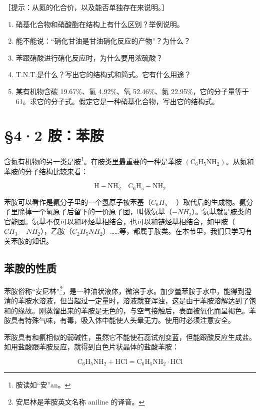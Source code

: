 ［提示：从氮的化合价，以及能否单独存在来说明。］

\begin{enumerate}[start=2]
\item
  硝基化合物和硝酸酯在结构上有什么区别？举例说明。
\item
  能不能说：``硝化甘油是甘油硝化反应的产物''？为什么？
\item
  苯跟硝酸进行硝化反应时，为什么要用浓硫酸？
\item
  T.N.T.是什么？写出它的结构式和简式。它有什么用途？
\item
  某有机物含碳 19.67\%、氢 4.92\%、氧 52.46\%、氮
  22.95\%，它的分子量等于
  61。求它的分子式。假定它是一种硝基化合物，写出它的结构式。
\end{enumerate}

\section{§4·2 胺：苯胺}

含氮有机物的另一类是胺\footnote{胺读如``安''an。}。在胺类里最重要的一种是苯胺
\(\left(\mathrm{C}_{6}\mathrm{H}_{5}\mathrm{NH}_{2}\right)\)。从氮和苯胺的分子结构比较来看：

\[
\mathrm{H} - \mathrm{NH} _ {2} \quad \mathrm{C} _ {6} \mathrm{H} _ {5} - \mathrm{NH} _ {2}
\]

苯胺可以看作是氨分子里的一个氢原子被苯基（\(C_6H_5-\)）取代后的生成物。氨分子里除掉一个氢原子后留下的一价原子团，叫做氨基（\(-NH_2\)）。氨基就是胺类的官能团。氨基不仅可以和环烃基相结合，也可以和链烃基相结合，如甲胺（\(CH_3-NH_2\)），乙胺（\(C_2H_5NH_2\)）\ldots\ldots 等，都属于胺类。在本节里，我们只学习有关苯胺的知识。

\subsection{苯胺的性质}

苯胺俗称``安尼林''\footnote{安尼林是苯胺英文名称 aniline 的译音。}，是一种油状液体，微溶于水。加少量苯胺于水中，能得到澄清的苯胺水溶液，但当超过一定量时，溶液就变浑浊，这是由于苯胺溶解达到了饱和的缘故。刚蒸馏出来的苯胺是无色的，与空气接触后，表面被氧化而呈褐色。苯胺具有特殊气味，有毒，吸入体中能使人头晕无力。使用时必须注意安全。

苯胺具有和氨相似的弱碱性，虽然它不能使石蕊试剂变蓝，但能跟酸反应生成盐。如用盐酸跟苯胺反应，就得到白色片状晶体的盐酸苯胺：

\[
\mathrm{C} _ {6} \mathrm{H} _ {5} \mathrm{NH} _ {2} + \mathrm{HCl} = \mathrm{C} _ {6} \mathrm{H} _ {5} \mathrm{NH} _ {2} \cdot \mathrm{HCl}
\]

